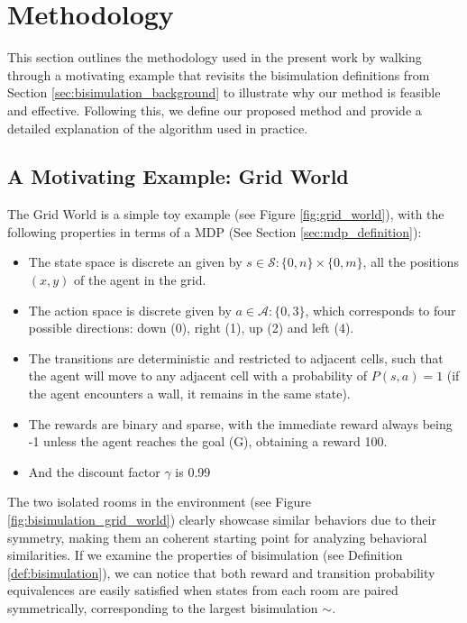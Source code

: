 
\chapter{Methodology}
This section outlines the methodology used in the present work by walking through a motivating example that revisits the bisimulation definitions from Section \ref{sec:bisimulation_background} to illustrate why our method is feasible and effective. Following this, we define our proposed method and provide a detailed explanation of the algorithm used in practice.

\section{A Motivating Example: Grid World}

The Grid World is a simple toy example (see Figure \ref{fig:grid_world}), with the following properties in terms of a MDP (See Section \ref{sec:mdp_definition}):

\begin{itemize}
    \item The state space is discrete an given by $ s \in \mathcal{S} : \{0,n\} \times \{0,m\}$, all the positions $(x,y)$ of the agent in the grid.
    \item The action space is discrete given by $a \in \mathcal{A}: \{0,3\}$, which corresponds to four possible directions: down (0), right (1), up (2) and left (4).
    \item The transitions are deterministic and restricted to adjacent cells, such that the agent will move to any adjacent cell with a probability of $P(s,a) = 1$ (if the agent encounters a wall, it remains in the same state).
    \item The rewards are binary and sparse, with the immediate reward always being -1 unless the agent reaches the goal (G), obtaining a reward 100.
    \item And the discount factor $\gamma$ is 0.99
\end{itemize}

The two isolated rooms in the environment (see Figure \ref{fig:bisimulation_grid_world}) clearly showcase similar behaviors due to their symmetry, making them an coherent starting point for analyzing behavioral similarities. If we examine the properties of bisimulation (see Definition \ref{def:bisimulation}), we can notice that both reward and transition probability equivalences are easily satisfied when states from each room are paired symmetrically, corresponding to the largest bisimulation $\sim$.

